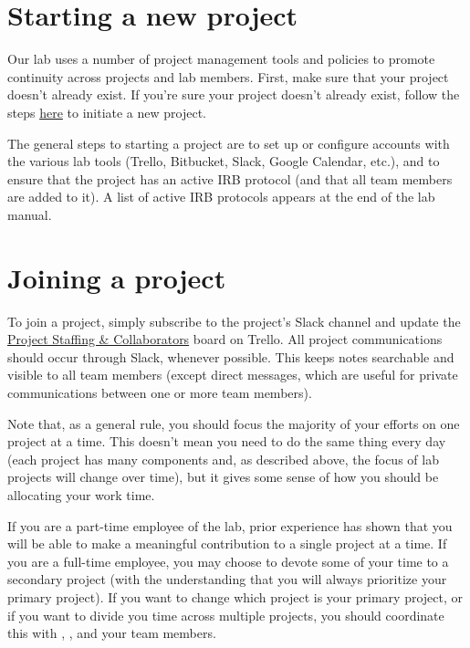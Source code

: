 \documentclass{tufte-book} %
\begin{document}
\section{Starting a new project}
Our lab uses a number of project management tools and policies to
promote continuity across projects and lab members.  First, make sure
that your project doesn't already exist.  If you're sure your project
doesn't already exist, follow the steps
\href{https://trello.com/b/s4L8fbot/initiate-a-project}{here} to
initiate a new project.

The general steps to starting a project are to set up or configure
accounts with the various lab tools (Trello, Bitbucket, Slack, Google
Calendar, etc.), and to ensure that the project has an active IRB
protocol (and that all team members are added to it).  A list of
active IRB protocols appears at the end of the lab manual.

\section{Joining a project}
To join a project, simply subscribe to the project's Slack channel and
update the
\href{https://trello.com/b/IWQ00r69/project-staffing-collaborators}{Project
  Staffing \& Collaborators} board on Trello.  All project
communications should occur through Slack, whenever possible.  This
keeps notes searchable and visible to all team members (except direct
messages, which are useful for private communications between one or
more team members).

Note that, as a general rule, you should focus the majority of your
efforts on one project at a time.  This doesn't mean you need to do
the same thing every day (each project has many components and, as
described above, the focus of lab projects will change over time), but
it gives some sense of how you should be allocating your work time.

If you are a part-time employee of the lab, prior experience has shown
that you will be able to make a meaningful contribution to a single
project at a time.  If you are a full-time employee, you may choose to
devote some of your time to a secondary project (with the
understanding that you will always prioritize your primary project).
If you want to change which project is your primary project, or if you
want to divide you time across multiple projects, you should
coordinate this with \director, \coordinator, and your team members.
\end{document}
